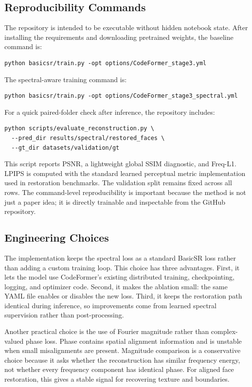 \documentclass[10pt,twocolumn,letterpaper]{article}
\begin{document}
\subsection{Reproducibility Commands}
The repository is intended to be executable without hidden notebook state. After installing the requirements and downloading pretrained weights, the baseline command is:
\begin{verbatim}
python basicsr/train.py -opt options/CodeFormer_stage3.yml
\end{verbatim}
The spectral-aware training command is:
\begin{verbatim}
python basicsr/train.py -opt options/CodeFormer_stage3_spectral.yml
\end{verbatim}
For a quick paired-folder check after inference, the repository includes:
\begin{verbatim}
python scripts/evaluate_reconstruction.py \
  --pred_dir results/spectral/restored_faces \
  --gt_dir datasets/validation/gt
\end{verbatim}
This script reports PSNR, a lightweight global SSIM diagnostic, and Freq-L1. LPIPS is computed with the standard learned perceptual metric implementation used in restoration benchmarks. The validation split remains fixed across all rows. The command-level reproducibility is important because the method is not just a paper idea; it is directly trainable and inspectable from the GitHub repository.

\subsection{Engineering Choices}
The implementation keeps the spectral loss as a standard BasicSR loss rather than adding a custom training loop. This choice has three advantages. First, it lets the model use CodeFormer's existing distributed training, checkpointing, logging, and optimizer code. Second, it makes the ablation small: the same YAML file enables or disables the new loss. Third, it keeps the restoration path identical during inference, so improvements come from learned spectral supervision rather than post-processing.

Another practical choice is the use of Fourier magnitude rather than complex-valued phase loss. Phase contains spatial alignment information and is unstable when small misalignments are present. Magnitude comparison is a conservative choice because it asks whether the reconstruction has similar frequency energy, not whether every frequency component has identical phase. For aligned face restoration, this gives a stable signal for recovering texture and boundaries.
\end{document}
